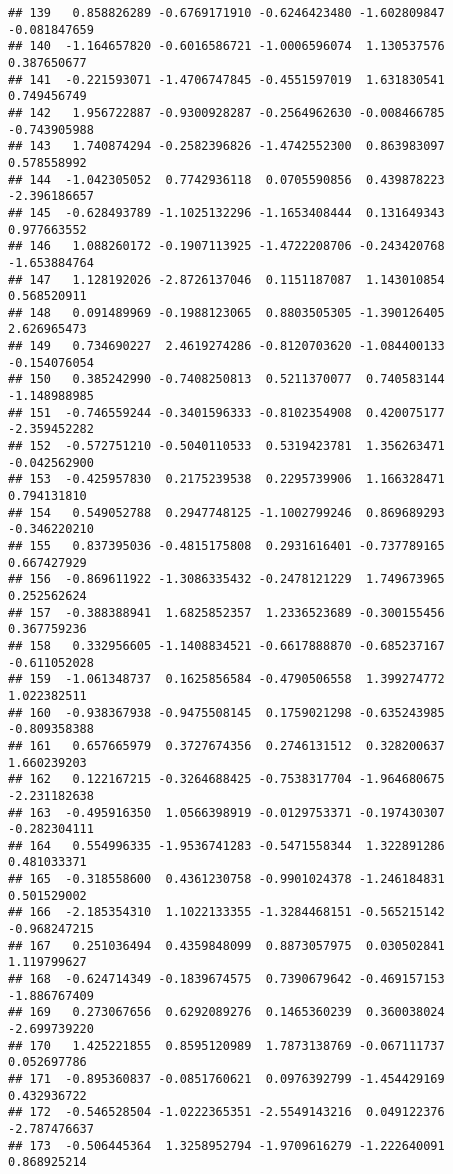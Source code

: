\documentclass[
]{article}
\begin{document}
\begin{verbatim}
## 139   0.858826289 -0.6769171910 -0.6246423480 -1.602809847 -0.081847659
## 140  -1.164657820 -0.6016586721 -1.0006596074  1.130537576  0.387650677
## 141  -0.221593071 -1.4706747845 -0.4551597019  1.631830541  0.749456749
## 142   1.956722887 -0.9300928287 -0.2564962630 -0.008466785 -0.743905988
## 143   1.740874294 -0.2582396826 -1.4742552300  0.863983097  0.578558992
## 144  -1.042305052  0.7742936118  0.0705590856  0.439878223 -2.396186657
## 145  -0.628493789 -1.1025132296 -1.1653408444  0.131649343  0.977663552
## 146   1.088260172 -0.1907113925 -1.4722208706 -0.243420768 -1.653884764
## 147   1.128192026 -2.8726137046  0.1151187087  1.143010854  0.568520911
## 148   0.091489969 -0.1988123065  0.8803505305 -1.390126405  2.626965473
## 149   0.734690227  2.4619274286 -0.8120703620 -1.084400133 -0.154076054
## 150   0.385242990 -0.7408250813  0.5211370077  0.740583144 -1.148988985
## 151  -0.746559244 -0.3401596333 -0.8102354908  0.420075177 -2.359452282
## 152  -0.572751210 -0.5040110533  0.5319423781  1.356263471 -0.042562900
## 153  -0.425957830  0.2175239538  0.2295739906  1.166328471  0.794131810
## 154   0.549052788  0.2947748125 -1.1002799246  0.869689293 -0.346220210
## 155   0.837395036 -0.4815175808  0.2931616401 -0.737789165  0.667427929
## 156  -0.869611922 -1.3086335432 -0.2478121229  1.749673965  0.252562624
## 157  -0.388388941  1.6825852357  1.2336523689 -0.300155456  0.367759236
## 158   0.332956605 -1.1408834521 -0.6617888870 -0.685237167 -0.611052028
## 159  -1.061348737  0.1625856584 -0.4790506558  1.399274772  1.022382511
## 160  -0.938367938 -0.9475508145  0.1759021298 -0.635243985 -0.809358388
## 161   0.657665979  0.3727674356  0.2746131512  0.328200637  1.660239203
## 162   0.122167215 -0.3264688425 -0.7538317704 -1.964680675 -2.231182638
## 163  -0.495916350  1.0566398919 -0.0129753371 -0.197430307 -0.282304111
## 164   0.554996335 -1.9536741283 -0.5471558344  1.322891286  0.481033371
## 165  -0.318558600  0.4361230758 -0.9901024378 -1.246184831  0.501529002
## 166  -2.185354310  1.1022133355 -1.3284468151 -0.565215142 -0.968247215
## 167   0.251036494  0.4359848099  0.8873057975  0.030502841  1.119799627
## 168  -0.624714349 -0.1839674575  0.7390679642 -0.469157153 -1.886767409
## 169   0.273067656  0.6292089276  0.1465360239  0.360038024 -2.699739220
## 170   1.425221855  0.8595120989  1.7873138769 -0.067111737  0.052697786
## 171  -0.895360837 -0.0851760621  0.0976392799 -1.454429169  0.432936722
## 172  -0.546528504 -1.0222365351 -2.5549143216  0.049122376 -2.787476637
## 173  -0.506445364  1.3258952794 -1.9709616279 -1.222640091  0.868925214

\end{verbatim}
\end{document}
